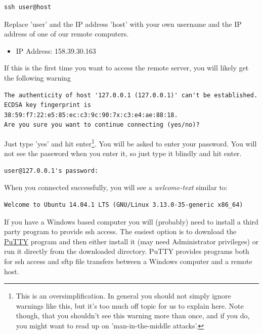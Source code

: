 \documentclass[11pt]{article}
\begin{document}
\begin{verbatim}
ssh user@host
\end{verbatim}


Replace 'user' and the IP address 'host' with your own
username and the IP address of one of our remote computers.

\begin{itemize}
\item IP Address: 158.39.30.163
\end{itemize}

If this is the first time you want to access the remote server, you
will likely get the following warning

\begin{verbatim}
The authenticity of host '127.0.0.1 (127.0.0.1)' can't be established.
ECDSA key fingerprint is 38:59:f7:22:e5:85:ec:c3:9c:90:7x:c3:e4:ae:88:18.
Are you sure you want to continue connecting (yes/no)?
\end{verbatim}

Just type 'yes' and hit enter\footnote{This is an oversimplification. In general you should not simply
ignore warnings like this, but it's too much off topic for us to
explain here. Note though, that you shouldn't see this warning more
than once, and if you do, you might want to read up on
'man-in-the-middle attacks'.}. You will be asked to enter your
password. You will not see the password when you enter it, so just
type it blindly and hit enter.

\begin{verbatim}
user@127.0.0.1's password:
\end{verbatim}

When you connected successfully, you will see a \emph{welcome-text} similar to:

\begin{verbatim}
Welcome to Ubuntu 14.04.1 LTS (GNU/Linux 3.13.0-35-generic x86_64)
\end{verbatim}


If you have a Windows based computer you will (probably) need to install a third
party program to provide ssh access. The easiest option is to download the
\href{http://www.chiark.greenend.org.uk/~sgtatham/putty/download.html}{PuTTY} program and then either install it (may need Administrator privileges) or
run it directly from the downloaded directory. PuTTY provides programs both
for ssh access and sftp file transfers between a Windows computer and a remote
host.
\end{document}
